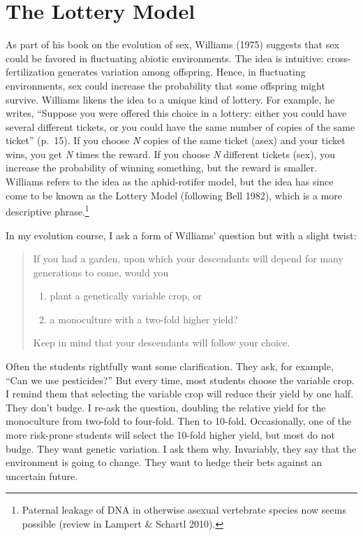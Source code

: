 \documentclass[
  letterpaper,
]{book}
\providecommand{\tightlist}{%
  \setlength{\itemsep}{0pt}\setlength{\parskip}{0pt}}\usepackage{longtable,booktabs,array}
\begin{document}
\section{The Lottery Model}\label{the-lottery-model}

As part of his book on the evolution of sex, Williams (1975) suggests
that sex could be favored in fluctuating abiotic environments. The idea
is intuitive: cross-fertilization generates variation among offspring.
Hence, in fluctuating environments, sex could increase the probability
that some offspring might survive. Williams likens the idea to a unique
kind of lottery. For example, he writes, ``Suppose you were offered this
choice in a lottery: either you could have several different tickets, or
you could have the same number of copies of the same ticket'' (p.~15).
If you choose \emph{N} copies of the same ticket (asex) and your ticket
wins, you get \emph{N} times the reward. If you choose \emph{N}
different tickets (sex), you increase the probability of winning
something, but the reward is smaller. Williams refers to the idea as the
aphid-rotifer model, but the idea has since come to be known as the
Lottery Model (following Bell 1982), which is a more descriptive
phrase.\footnote{Paternal leakage of DNA in otherwise asexual vertebrate
  species now seems possible (review in Lampert \& Schartl 2010).}

In my evolution course, I ask a form of Williams' question but with a
slight twist:

\begin{quote}
If you had a garden, upon which your descendants will depend for many
generations to come, would you

\begin{enumerate}
\def\labelenumi{\arabic{enumi}.}
\tightlist
\item
  plant a genetically variable crop, or
\item
  a monoculture with a two-fold higher yield?
\end{enumerate}

Keep in mind that your descendants will follow your choice.
\end{quote}

Often the students rightfully want some clarification. They ask, for
example, ``Can we use pesticides?'' But every time, most students choose
the variable crop. I remind them that selecting the variable crop will
reduce their yield by one half. They don't budge. I re-ask the question,
doubling the relative yield for the monoculture from two-fold to
four-fold. Then to 10-fold. Occasionally, one of the more risk-prone
students will select the 10-fold higher yield, but most do not budge.
They want genetic variation. I ask them why. Invariably, they say that
the environment is going to change. They want to hedge their bets
against an uncertain future.
\end{document}
